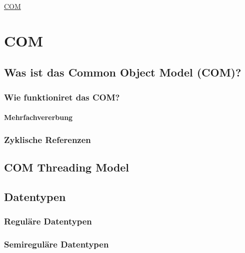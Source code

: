 \raggedright
\footnotesize
\begin{multicols}{3}	
	\setlength{\premulticols}{1pt}
	\setlength{\postmulticols}{1pt}
	\setlength{\multicolsep}{1pt}
	\setlength{\columnsep}{2pt}

\begin{center}
     \Large{\underline{COM}} \\
\end{center}
\section{COM}

\subsection{Was ist das Common Object Model (COM)?}
\lipsum[1]

\subsubsection{Wie funktioniret das COM?}
\lipsum[1]

\paragraph{Mehrfachvererbung}
\lipsum[1]

\subsubsection{Zyklische Referenzen}
\lipsum[1]

\subsection{COM Threading Model}
\lipsum[1]

\subsection{Datentypen}
\lipsum[1]

\subsubsection{Reguläre Datentypen}
\lipsum[1]

\subsubsection{Semireguläre Datentypen}
\lipsum[1]


\end{multicols}
